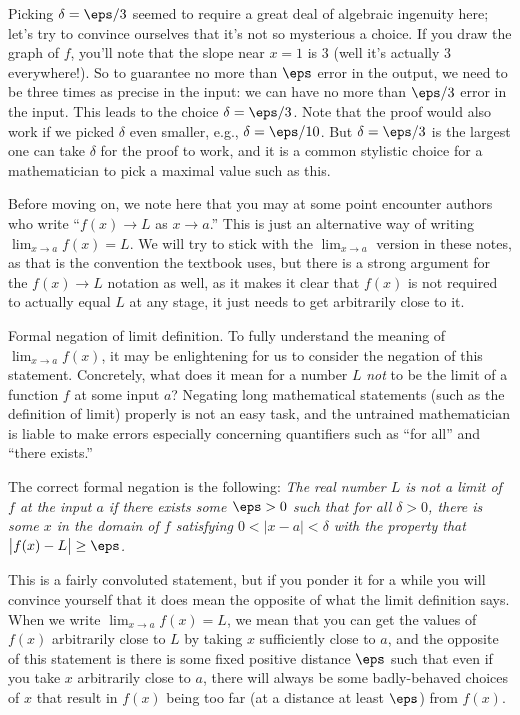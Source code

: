 Picking $\delta = \eps/3$ seemed to require a great deal of algebraic ingenuity here; let's try to convince
ourselves that it's not so mysterious a choice.
If you draw the graph of $f$, you'll note that the slope near $x=1$ is $3$
(well it's actually $3$ everywhere!). So to guarantee no more than $\eps$ error in the output, we need
to be three times as precise in the input: we can have no more than $\eps/3$ error in the input.
This leads to the choice $\delta = \eps/3$. Note that the proof would also
work if we picked $\delta$ even smaller, e.g., $\delta = \eps/10$. But $\delta = \eps/3$ is the
largest one can take
$\delta$ for the proof to work, and it is a common stylistic choice for a mathematician to pick a maximal value
such as this.

Before moving on, we note here that you may at some point encounter authors who
write ``$f(x)\to L$ as $x\to a$.'' This is just an alternative way of writing $\lim_{x\to a} f(x) = L$.
We will try to stick with the $\lim_{x\to a}$ version in these notes, as that is the convention the textbook
uses, but there is a strong argument for the $f(x)\to L$ notation as well, as it makes it clear that
$f(x)$ is not required to actually equal $L$ at any stage, it just needs to get arbitrarily close to it.

\medskip\boldlabel {} Formal negation of limit definition.
To fully understand the meaning of $\lim_{x\to a} f(x)$, it may be enlightening for us to
consider the negation of this statement. Concretely, what does it mean
for a number $L$ {\it not} to be the limit of a function $f$ at some input $a$?
Negating long mathematical statements (such as the definition of limit)
properly is not an easy task, and the untrained mathematician is liable to make errors especially concerning
quantifiers such as ``for all'' and ``there exists.''

The correct formal negation is the following: {\sl The real number $L$ is {\it not} a
limit of $f$ at the input $a$ if there exists some $\eps>0$ such that for all $\delta > 0$, there is
some $x$ in the domain of $f$ satisfying $0<|x-a|<\delta$ with the property that
$\bigl| f(x) - L\bigr| \ge \eps$.}

This is a fairly convoluted statement, but if you ponder it for a while you will convince yourself that
it does mean the opposite of what the limit definition says. When we write $\lim_{x\to a} f(x) = L$, we mean
that you can get the values of $f(x)$ arbitrarily close to $L$ by taking $x$ sufficiently close to $a$,
and the opposite of this statement is there is some fixed positive distance $\eps$ such that even if you take
$x$ arbitrarily close to $a$, there will always be some badly-behaved choices of $x$ that result in
$f(x)$ being too far (at a distance at least $\eps$) from $f(x)$.

